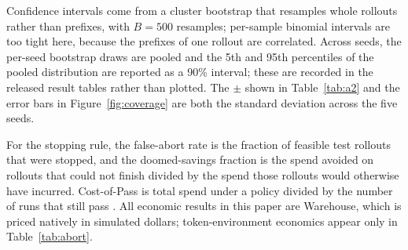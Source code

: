 \documentclass{article}
\begin{document}
Confidence intervals come from a cluster bootstrap that resamples whole rollouts rather
than prefixes, with $B = 500$ resamples; per-sample binomial intervals are too tight
here, because the prefixes of one rollout are correlated. Across seeds, the per-seed
bootstrap draws are pooled and the 5th and 95th percentiles of the pooled distribution
are reported as a 90\% interval; these are recorded in the released result tables
rather than plotted. The $\pm$ shown in Table~\ref{tab:a2} and the error bars in
Figure~\ref{fig:coverage} are both the standard deviation across the five seeds.

For the stopping rule, the false-abort rate is the fraction of feasible test rollouts
that were stopped, and the doomed-savings fraction is the spend avoided on rollouts
that could not finish divided by the spend those rollouts would otherwise have
incurred. Cost-of-Pass is total spend under a policy divided by the number of runs that
still pass \cite{erol2026costofpass}. All economic results in this paper are Warehouse,
which is priced natively in simulated dollars; token-environment economics appear only
in Table~\ref{tab:abort}.
\end{document}
